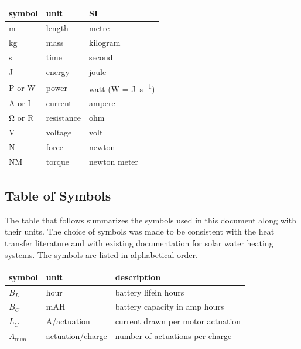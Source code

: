 \documentclass[12pt]{article}
\begin{document}
\renewcommand{\arraystretch}{1.2}
  \noindent \begin{tabular}{l l l} 
    \toprule		
    \textbf{symbol} & \textbf{unit} & \textbf{SI}\\
    \midrule 
    \si{\metre} & length & metre\\
    \si{\kilogram} & mass	& kilogram\\
    \si{\second} & time & second\\
    \si{\joule} & energy & joule\\
    P or \si{\watt} & power & watt (W = \si{\joule\per\second})\\
    \si{\ampere} or I& current & ampere\\
    \si{\ohm} or R& resistance & ohm\\
    \si{\volt} & voltage & volt\\
    \si{\newton} & force & newton\\
    \si{\newton}M & torque & newton meter\\
    \bottomrule
  \end{tabular}

\subsection{Table of Symbols}

The table that follows summarizes the symbols used in this document along with
their units.  The choice of symbols was made to be consistent with the heat
transfer literature and with existing documentation for solar water heating
systems.  The symbols are listed in alphabetical order.

\renewcommand{\arraystretch}{1.2}
\noindent \begin{longtable*}{l l p{12cm}} \toprule
\textbf{symbol} & \textbf{unit} & \textbf{description}\\
\midrule 
$B_L$ & hour & battery lifein hours\\
$B_C$ & mAH & battery capacity in amp hours\\
$L_C$ & A/actuation & current drawn per motor actuation\\
$A_\text{num}$ & actuation/charge & number of actuations per charge\\ 
\bottomrule
\end{longtable*}
\end{document}
